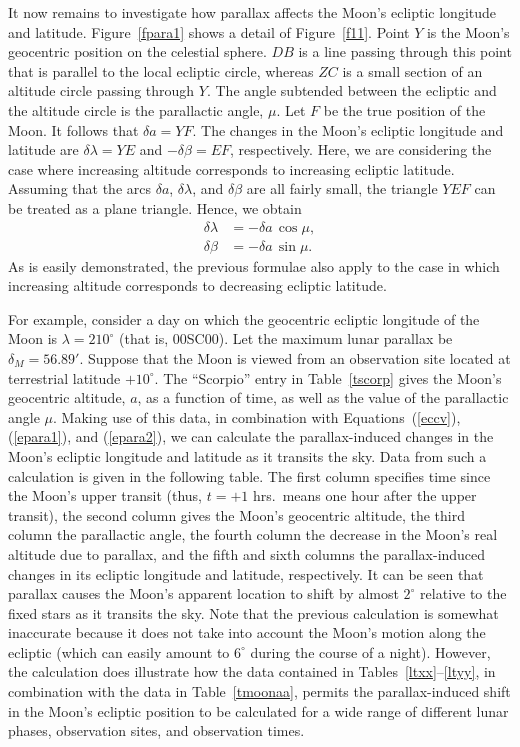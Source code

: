 It now remains to investigate how parallax affects the Moon's ecliptic
longitude and latitude. Figure~\ref{fpara1} shows a detail of Figure~\ref{f11}. Point $Y$ is the Moon's geocentric position on the celestial sphere. $DB$ is a line passing through this point
that is parallel to the local ecliptic circle, whereas $ZC$ is a small section of an
altitude circle passing through $Y$. The angle subtended between the ecliptic and the altitude circle is the parallactic angle, $\mu$. Let $F$ be the true position of the Moon.
It follows that $\delta a = YF$. The changes in the Moon's ecliptic longitude
and latitude are $\delta\lambda = YE$ and  $-\delta\beta = EF$, respectively. Here, we are considering the case where   increasing 
altitude corresponds to  increasing ecliptic latitude.
Assuming that the arcs $\delta a$, $\delta\lambda$, and $\delta\beta$ are
all fairly small, the triangle $YEF$ can be treated as a plane triangle.
Hence, we obtain
\begin{align}\label{epara1}
\delta\lambda &= - \delta a\,\cos\mu,\\[0.5ex]
\delta\beta &= - \delta a\,\sin\mu.\label{epara2}
\end{align}
As is easily demonstrated, the previous formulae also apply to the case in which increasing  altitude corresponds
to  decreasing  ecliptic latitude.

For example, consider a day on which the geocentric ecliptic longitude of the Moon is $\lambda=210^\circ$ (that is, 00SC00). 
Let the maximum lunar parallax be $\delta_M = 56.89'$.
Suppose that the Moon is
viewed from an observation site located  at terrestrial latitude $+10^\circ$. 
The ``Scorpio'' entry in Table~\ref{tscorp} gives the Moon's geocentric altitude, $a$, as a function of time, as well as the
value of the parallactic angle $\mu$. Making use of this data,
in combination with  Equations~(\ref{eccv}), (\ref{epara1}),  and (\ref{epara2}), we can calculate the parallax-induced changes in the Moon's ecliptic
longitude and latitude as it transits the sky. 
Data from such a calculation is given in the following table. The first column specifies
time since the  Moon's upper transit (thus, $t=+1$ hrs.\ means one hour after  the
upper transit), the second column gives the Moon's geocentric altitude, the third column the parallactic angle, 
the
fourth column the decrease in the Moon's real altitude due to parallax, and the fifth and
sixth columns the parallax-induced changes in its ecliptic longitude and latitude, respectively. 
It can be seen that parallax causes the Moon's apparent location
 to shift by almost $2^\circ$ relative to the fixed stars as it transits the sky. Note that the
previous calculation is somewhat inaccurate because it does not take into account the Moon's motion along the
ecliptic (which can easily amount to $6^\circ$ during the course of a night).
However, the calculation does illustrate how the data contained in
Tables~\ref{ltxx}--\ref{ltyy}, in combination with the data in Table~\ref{tmoonaa}, permits the parallax-induced shift in the Moon's ecliptic position
to be calculated for a wide range of different lunar phases,
observation sites, and observation times.


